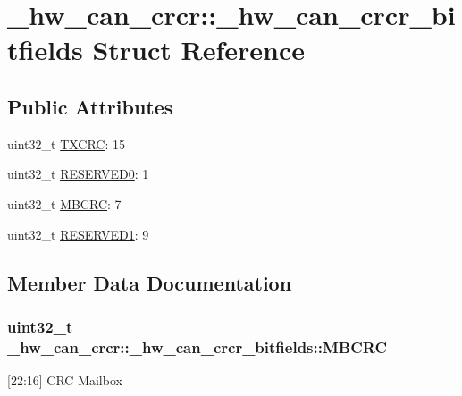 \hypertarget{struct__hw__can__crcr_1_1__hw__can__crcr__bitfields}{}\section{\+\_\+hw\+\_\+can\+\_\+crcr\+:\+:\+\_\+hw\+\_\+can\+\_\+crcr\+\_\+bitfields Struct Reference}
\label{struct__hw__can__crcr_1_1__hw__can__crcr__bitfields}
\subsection*{Public Attributes}
\begin{DoxyCompactItemize}
\item 
uint32\+\_\+t \hyperlink{struct__hw__can__crcr_1_1__hw__can__crcr__bitfields_a352d6e51531b5556145851a5b8ace882}{T\+X\+C\+RC}\+: 15
\item 
uint32\+\_\+t \hyperlink{struct__hw__can__crcr_1_1__hw__can__crcr__bitfields_a9a327a8fca2ca46365c1ee8912e015b1}{R\+E\+S\+E\+R\+V\+E\+D0}\+: 1
\item 
uint32\+\_\+t \hyperlink{struct__hw__can__crcr_1_1__hw__can__crcr__bitfields_a74286e1b6f2ecf0cd7411995ecf4b6b3}{M\+B\+C\+RC}\+: 7
\item 
uint32\+\_\+t \hyperlink{struct__hw__can__crcr_1_1__hw__can__crcr__bitfields_aac01c4a32eff6b4413693fd0fd6580be}{R\+E\+S\+E\+R\+V\+E\+D1}\+: 9
\end{DoxyCompactItemize}


\subsection{Member Data Documentation}
\subsubsection[{\texorpdfstring{M\+B\+C\+RC}{MBCRC}}]{\setlength{\rightskip}{0pt plus 5cm}uint32\+\_\+t \+\_\+hw\+\_\+can\+\_\+crcr\+::\+\_\+hw\+\_\+can\+\_\+crcr\+\_\+bitfields\+::\+M\+B\+C\+RC}\hypertarget{struct__hw__can__crcr_1_1__hw__can__crcr__bitfields_a74286e1b6f2ecf0cd7411995ecf4b6b3}{}\label{struct__hw__can__crcr_1_1__hw__can__crcr__bitfields_a74286e1b6f2ecf0cd7411995ecf4b6b3}
\mbox{[}22\+:16\mbox{]} C\+RC Mailbox 
